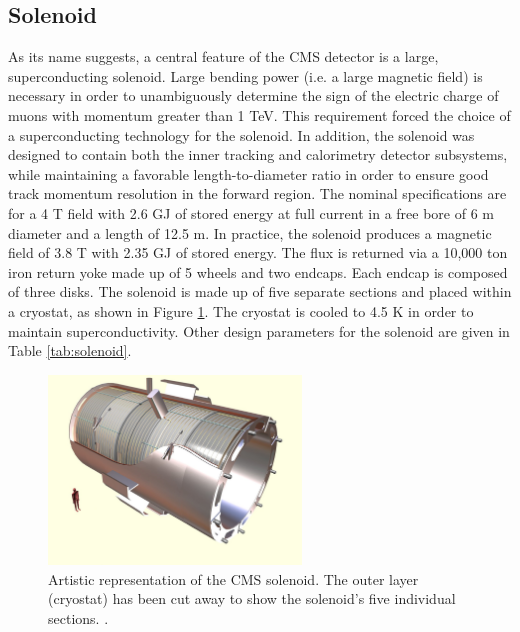 \subsection{Solenoid}
\label{sec:solenoid}

As its name suggests, a central feature of the CMS 
detector is a large, superconducting solenoid.  
Large bending power (i.e. a large magnetic field) 
is necessary in order to unambiguously determine the sign of the electric charge 
of muons with momentum greater than 1 TeV.  This requirement forced the choice
of a superconducting technology for the solenoid.
In addition, the solenoid was designed to contain both the inner tracking 
and calorimetry detector subsystems, while maintaining a favorable 
length-to-diameter ratio in order to ensure good track momentum resolution
in the forward region.
The nominal specifications are for a 4 T field
with 2.6 GJ of stored energy at full current in
a free bore of 6 m diameter and a length of 12.5 m.
In practice, the solenoid produces a magnetic field of 3.8 T with 
2.35 GJ of stored energy.
The flux is returned via a 10,000 ton iron return yoke made up
of 5 wheels and two endcaps.  Each endcap is composed of three disks.
The solenoid is made up of five separate sections and placed within a cryostat,
as shown in Figure \ref{fig:solenoid}.
The cryostat is cooled to 4.5 K in order to maintain superconductivity.
Other design parameters for the solenoid are given in Table
\ref{tab:solenoid}.  

\begin{figure}
  \centering
  \includegraphics[width=0.6\textwidth]{tex/cms/fig/magnet-schematic.jpg}
  \caption{Artistic representation of the CMS solenoid.  The outer layer (cryostat)
    has been cut away to show the solenoid's five individual sections. \cite{cms-jinst}.}
  \label{fig:solenoid}
\end{figure}

